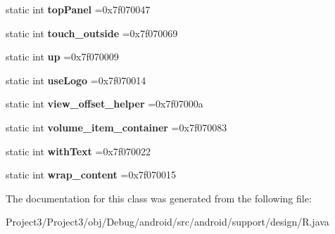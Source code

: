 \begin{DoxyCompactItemize}
static int {\bfseries top\+Panel} =0x7f070047
\item 
\mbox{\label{classandroid_1_1support_1_1design_1_1R_1_1id_a70f141d621857e62972a0057cddda032}} 
static int {\bfseries touch\+\_\+outside} =0x7f070069
\item 
\mbox{\label{classandroid_1_1support_1_1design_1_1R_1_1id_a3a58dceae83fd2817cc6fde2088f64d1}} 
static int {\bfseries up} =0x7f070009
\item 
\mbox{\label{classandroid_1_1support_1_1design_1_1R_1_1id_a33a59e253ce4b2827ae2a5c6f739481f}} 
static int {\bfseries use\+Logo} =0x7f070014
\item 
\mbox{\label{classandroid_1_1support_1_1design_1_1R_1_1id_ac24d4e16ad412749a9cbdc8b6e3458d2}} 
static int {\bfseries view\+\_\+offset\+\_\+helper} =0x7f07000a
\item 
\mbox{\label{classandroid_1_1support_1_1design_1_1R_1_1id_a6d6f68176eae1d0e516c55bcfb29cb88}} 
static int {\bfseries volume\+\_\+item\+\_\+container} =0x7f070083
\item 
\mbox{\label{classandroid_1_1support_1_1design_1_1R_1_1id_af07cea62bfd371a4efa9d11518813edf}} 
static int {\bfseries with\+Text} =0x7f070022
\item 
\mbox{\label{classandroid_1_1support_1_1design_1_1R_1_1id_af7cf382fa71f4feba53fc017d66eb64b}} 
static int {\bfseries wrap\+\_\+content} =0x7f070015
\end{DoxyCompactItemize}


The documentation for this class was generated from the following file\+:\begin{DoxyCompactItemize}
\item 
Project3/\+Project3/obj/\+Debug/android/src/android/support/design/R.\+java\end{DoxyCompactItemize}
